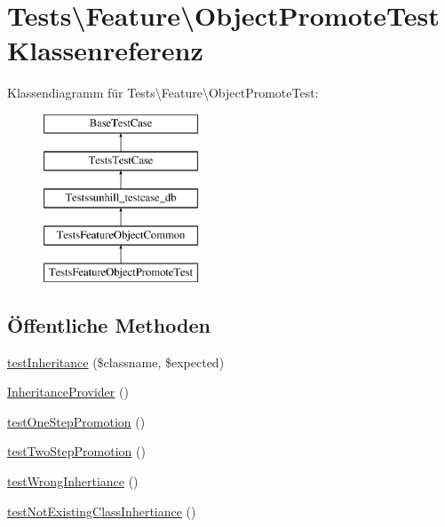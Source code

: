 \hypertarget{classTests_1_1Feature_1_1ObjectPromoteTest}{}\section{Tests\textbackslash{}Feature\textbackslash{}Object\+Promote\+Test Klassenreferenz}
\label{classTests_1_1Feature_1_1ObjectPromoteTest}
Klassendiagramm für Tests\textbackslash{}Feature\textbackslash{}Object\+Promote\+Test\+:\begin{figure}[H]
\begin{center}
\leavevmode
\includegraphics[height=5.000000cm]{df/dae/classTests_1_1Feature_1_1ObjectPromoteTest}
\end{center}
\end{figure}
\subsection*{Öffentliche Methoden}
\begin{DoxyCompactItemize}
\item 
\hyperlink{classTests_1_1Feature_1_1ObjectPromoteTest_a8e786bd211dfebd5417bc7fed4967ae3}{test\+Inheritance} (\$classname, \$expected)
\item 
\hyperlink{classTests_1_1Feature_1_1ObjectPromoteTest_afae7c89e33875e8890f23107ec3a98ac}{Inheritance\+Provider} ()
\item 
\hyperlink{classTests_1_1Feature_1_1ObjectPromoteTest_ad9a2f76c3523e9971014a1a9e4d89fca}{test\+One\+Step\+Promotion} ()
\item 
\hyperlink{classTests_1_1Feature_1_1ObjectPromoteTest_a2b77973fe2b8b680985513ff1b518fa5}{test\+Two\+Step\+Promotion} ()
\item 
\hyperlink{classTests_1_1Feature_1_1ObjectPromoteTest_a1aab5886a73b852bed1bc005012c245c}{test\+Wrong\+Inhertiance} ()
\item 
\hyperlink{classTests_1_1Feature_1_1ObjectPromoteTest_a0b830343c8babeab37a31d50127df07d}{test\+Not\+Existing\+Class\+Inhertiance} ()
\end{DoxyCompactItemize}
